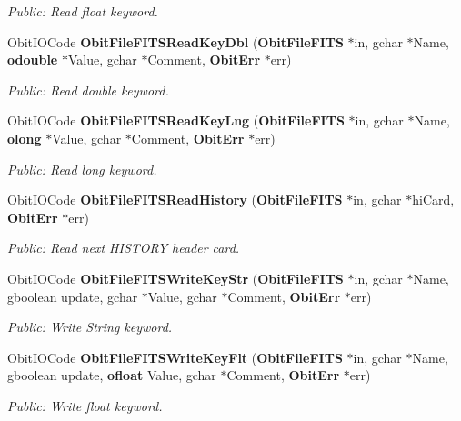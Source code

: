\begin{CompactItemize}
\begin{CompactList}\small\item\em Public: Read float keyword. \item\end{CompactList}\item 
Obit\-IOCode {\bf Obit\-File\-FITSRead\-Key\-Dbl} ({\bf Obit\-File\-FITS} $\ast$in, gchar $\ast$Name, {\bf odouble} $\ast$Value, gchar $\ast$Comment, {\bf Obit\-Err} $\ast$err)
\begin{CompactList}\small\item\em Public: Read double keyword. \item\end{CompactList}\item 
Obit\-IOCode {\bf Obit\-File\-FITSRead\-Key\-Lng} ({\bf Obit\-File\-FITS} $\ast$in, gchar $\ast$Name, {\bf olong} $\ast$Value, gchar $\ast$Comment, {\bf Obit\-Err} $\ast$err)
\begin{CompactList}\small\item\em Public: Read long keyword. \item\end{CompactList}\item 
Obit\-IOCode {\bf Obit\-File\-FITSRead\-History} ({\bf Obit\-File\-FITS} $\ast$in, gchar $\ast$hi\-Card, {\bf Obit\-Err} $\ast$err)
\begin{CompactList}\small\item\em Public: Read next HISTORY header card. \item\end{CompactList}\item 
Obit\-IOCode {\bf Obit\-File\-FITSWrite\-Key\-Str} ({\bf Obit\-File\-FITS} $\ast$in, gchar $\ast$Name, gboolean update, gchar $\ast$Value, gchar $\ast$Comment, {\bf Obit\-Err} $\ast$err)
\begin{CompactList}\small\item\em Public: Write String keyword. \item\end{CompactList}\item 
Obit\-IOCode {\bf Obit\-File\-FITSWrite\-Key\-Flt} ({\bf Obit\-File\-FITS} $\ast$in, gchar $\ast$Name, gboolean update, {\bf ofloat} Value, gchar $\ast$Comment, {\bf Obit\-Err} $\ast$err)
\begin{CompactList}\small\item\em Public: Write float keyword. \item\end{CompactList}\item 

\end{CompactItemize}
